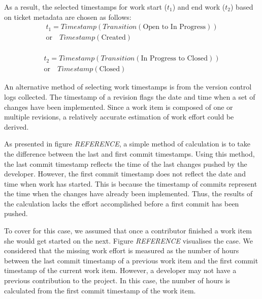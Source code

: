 \documentclass{mpaper}
\begin{document}
As a result, the selected timestamps for work start ($t_{1}$) and end work
($t_{2}$) based on ticket metadata are chosen as follows:
\begin{equation}
  \label{eq-ticket-start}
  \begin{aligned}
    t_{1} = Timestamp(Transition(\textrm{Open to In Progress})) \\ 
      \textrm{or} \quad Timestamp(\textrm{Created}) \\
  \end{aligned}
\end{equation}

\begin{equation}
  \label{eq-ticket-closed}
  \begin{aligned}
    t_{2} = Timestamp(Transition(\textrm{In Progress to Closed})) \\ 
      \textrm{or} \quad Timestamp(\textrm{Closed})    
  \end{aligned}
\end{equation}

An alternative method of selecting work timestamps is from the version control
logs collected. The timestamp of a revision flags the date and time when a set
of changes have been implemented. Since a work item is composed of one or
multiple revisions, a relatively accurate estimation of work effort could be
derived.

As presented in figure \emph{REFERENCE}, a simple method of calculation is to
take the difference between the last and first commit timestamps. Using this
method, the last commit timestamp reflects the time of the last changes pushed
by the developer. However, the first commit timestamp does not reflect the date
and time when work has started. This is because the timestamp of commits
represent the time when the changes have already been implemented. Thus, the
results of the calculation lacks the effort accomplished before a first commit
has been pushed.

To cover for this case, we assumed that once a contributor finished a work item
she would get started on the next. Figure \emph{REFERENCE} visualises the case.
We considered that the missing work effort is measured as the number of hours
between the last commit timestamp of a previous work item and the first commit
timestamp of the current work item. However, a developer may not have a previous
contribution to the project. In this case, the number of hours is calculated
from the first commit timestamp of the work item.
\end{document}
